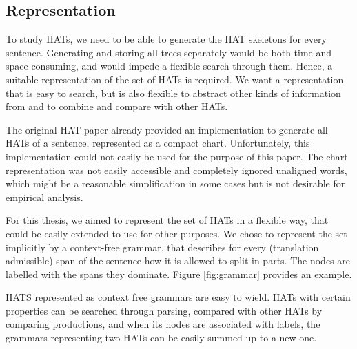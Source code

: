 \subsection{Representation}

To study HATs, we need to be able to generate the HAT skeletons for every sentence. Generating and storing all trees separately would be both time and space consuming, and would impede a flexible search through them. Hence, a suitable representation of the set of HATs is required. We want a representation that is easy to search, but is also flexible to abstract other kinds of information from and to combine and compare with other HATs.


The original HAT paper \citep{simaan2013hats} already provided an implementation to generate all HATs of a sentence, represented as a compact chart. Unfortunately, this implementation could not easily be used for the purpose of this paper. The chart representation was not easily accessible and completely ignored unaligned words, which might be a reasonable simplification in some cases but is not desirable for empirical analysis.

For this thesis, we aimed to represent the set of HATs in a flexible way, that could be easily extended to use for other purposes. We chose to represent the set implicitly by a context-free grammar, that describes for every (translation admissible) span of the sentence how it is allowed to split in parts. The nodes are labelled with the spans they dominate. Figure \ref{fig:grammar} provides an example.

HATS represented as context free grammars are easy to wield. HATs with certain properties can be searched through parsing, compared with other HATs by comparing productions, and when its nodes are associated with labels, the grammars representing two HATs can be easily summed up to a new one. 

